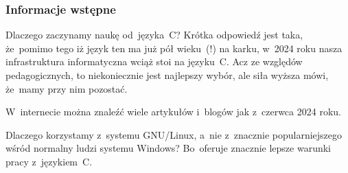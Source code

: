 \documentclass[10pt,t]{beamer}
\begin{document}
\begin{frame}
  \frametitle{Informacje wstępne}





  Dlaczego zaczynamy naukę od~języka~C? Krótka odpowiedź jest taka,
  że~pomimo tego iż język ten ma już pół wieku~(!) na karku, w~2024 roku
  nasza infrastruktura informatyczna wciąż stoi na języku~C. Acz ze
  względów pedagogicznych, to niekoniecznie jest najlepszy wybór, ale siła
  wyższa mówi, że~mamy przy nim pozostać.

  W~internecie można znaleźć wiele artykułów i~blogów jak
  z~czerwca 2024 roku.

  Dlaczego korzystamy z~systemu GNU/Linux, a~nie z~znacznie
  popularniejszego wśród normalny ludzi systemu Windows? Bo~oferuje
  znacznie lepsze warunki pracy z~językiem~C.


\end{frame}
\end{document}
